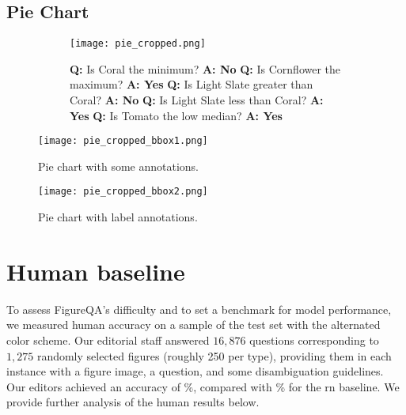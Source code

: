 \documentclass{article} \usepackage{iclr2018_workshop,times}
\begin{document}
\subsection{Pie Chart}
\begin{figure}[h]
    \centering
    \caption{Pie chart with question answer pairs.}
    \label{fig:pie_qa}
    \begin{subfigure}[]{0.6\textwidth}
        \texttt{[image: pie\_cropped.png]}
    \end{subfigure}
    \begin{subfigure}[]{0.38\textwidth}
        \textbf{Q:} Is Coral the minimum?\newline
        \textbf{A: No}\newline\newline
        \textbf{Q:} Is Cornflower the maximum?\newline
        \textbf{A: Yes}\newline\newline
        \textbf{Q:} Is Light Slate greater than Coral?\newline
        \textbf{A: No}\newline\newline
        \textbf{Q:} Is Light Slate less than Coral?\newline
        \textbf{A: Yes}\newline\newline
        \textbf{Q:} Is Tomato the low median?\newline
        \textbf{A: Yes}
    \end{subfigure}
\end{figure}

\begin{SCfigure}[][h]
    \texttt{[image: pie\_cropped\_bbox1.png]}
    \caption{Pie chart with some annotations.}
    \label{fig:pie_anno}
\end{SCfigure}

\begin{SCfigure}[][h]
    \texttt{[image: pie\_cropped\_bbox2.png]}
    \caption{Pie chart with label annotations.}
    \label{fig:pie_anno2}
\end{SCfigure}

\clearpage

\section{Human baseline}
\label{sec:human}
To assess FigureQA's difficulty and to set a benchmark for model performance, we measured human accuracy on a sample of the test set with the alternated color scheme.
Our editorial staff answered $16,876$ questions corresponding to $1,275$ randomly selected figures (roughly 250 per type),
providing them in each instance with a figure image, a question, and some disambiguation guidelines.
Our editors achieved an accuracy of \besthumantesttwohuman\%, compared with \bestrntesttwohuman\% for the \gls{rn} \citep{santoro2017simple} baseline.
We provide further analysis of the human results below.
\end{document}
